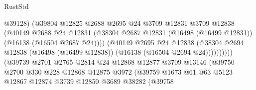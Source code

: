 \begin{lexlean}{RustStd}
\begin{coremodule}
                                          @39128)
                                        (@39804
                                          @12825
                                          @2688
                                          @2695
                                          @24
                                          @3709
                                          @12831
                                          @3709
                                          @12838
                                          (@40149
                                            @2688
                                            @24
                                            @12831
                                            (@38304
                                              @2687
                                              @12831
                                              (@16498 (@16499 @12831))
                                              (@16138 (@16504 @2687 @24))))
                                          (@40149
                                            @2695
                                            @24
                                            @12838
                                            (@38304
                                              @2694
                                              @12838
                                              (@16498 (@16499 @12838))
                                              (@16138 (@16504 @2694 @24))))))))))
                              (@39739
                                @2701
                                @2765
                                @2814
                                @24
                                @12868
                                @12877
                                @3709
                                @13146
                                (@39750
                                  @2700
                                  @330
                                  @228
                                  @12868
                                  @12875
                                  @3972
                                  (@39759
                                    @1673
                                    @61
                                    @63
                                    @5123
                                    @12867
                                    @12874
                                    @3739
                                    @12850
                                    @3689
                                    @38282
                                    (@39758

\end{coremodule}
\end{lexlean}
